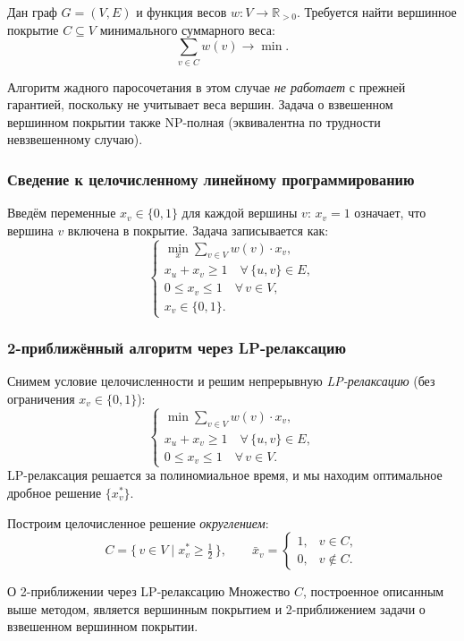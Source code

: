 Дан граф $G=(V,E)$ и функция весов $w\colon V \to \mathbb{R}_{>0}$. Требуется найти вершинное покрытие $C\subseteq V$ минимального суммарного веса:
\[
\sum_{v \in C} w(v) \to \min.
\]

Алгоритм жадного паросочетания в этом случае \emph{не работает} с прежней гарантией, поскольку не учитывает веса вершин. Задача о взвешенном вершинном покрытии также NP-полная (эквивалентна по трудности невзвешенному случаю).

\subsubsection*{Сведение к целочисленному линейному программированию}

Введём переменные $x_v \in \{0,1\}$ для каждой вершины $v$: $x_v = 1$ означает, что вершина $v$ включена в покрытие. Задача записывается как:
\[
\begin{cases}
	\displaystyle\min_{x} \sum_{v \in V} w(v)\cdot x_v, \\[4pt]
	x_u + x_v \geq 1 \quad \forall\, \{u,v\} \in E, \\[2pt]
	0 \leq x_v \leq 1 \quad \forall\, v \in V, \\[2pt]
	x_v \in \{0,1\}.
\end{cases}
\]

\subsubsection*{2-приближённый алгоритм через LP-релаксацию}

Снимем условие целочисленности и решим непрерывную \emph{LP-релаксацию} (без ограничения $x_v \in \{0,1\}$):
\[
\begin{cases}
	\displaystyle\min \sum_{v \in V} w(v)\cdot x_v, \\[4pt]
	x_u + x_v \geq 1 \quad \forall\, \{u,v\} \in E, \\[2pt]
	0 \leq x_v \leq 1 \quad \forall\, v \in V.
\end{cases}
\]
LP-релаксация решается за полиномиальное время, и мы находим оптимальное дробное решение $\{x^*_v\}$.

Построим целочисленное решение \emph{округлением}:
\[
C = \bigl\{\, v \in V \mid x^*_v \geq \tfrac{1}{2} \,\bigr\}, \qquad
\bar{x}_v = \begin{cases} 1, & v \in C, \\ 0, & v \notin C. \end{cases}
\]

\begin{Theorem}{О 2-приближении через LP-релаксацию}{}
	Множество $C$, построенное описанным выше методом, является вершинным покрытием и 2-приближением задачи о взвешенном вершинном покрытии.
\end{Theorem}

